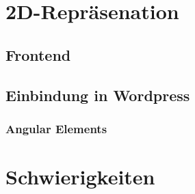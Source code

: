 \section{2D-Repräsenation}

\subsection{Frontend}

\subsection{Einbindung in Wordpress}
\subsubsection{Angular Elements}

\section{Schwierigkeiten}
\lipsum[7]